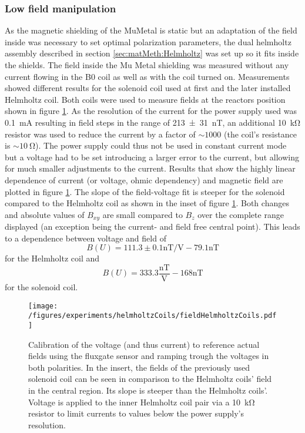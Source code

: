         \subsubsection{Low field manipulation}
        As the magnetic shielding of the MuMetal is static but an adaptation of the field inside was necessary to set optimal polarization parameters, the dual helmholtz assembly described in section \ref{sec:matMeth:Helmholtz} was set up so it fits inside the shields. The field inside the Mu Metal shielding was measured without any current flowing in the B0 coil as well as with the coil turned on. Measurements showed different results for the solenoid coil used at first and the later installed Helmholtz coil. Both coils were used to measure fields at the reactors position shown in figure \ref{figures:results:helmholtzCoilsCenterField}. As the resolution of the current for the power supply used was \SI{0.1}{\milli\ampere} resulting in field steps in the range of \SI{213\pm 31}{\nano\tesla}, an additional \SI{10}{\kilo\ohm} resistor was used to reduce the current by a factor of $\sim 1000$ (the coil's resistance is $\sim \SI{10}{\ohm}$). The power supply could thus not be used in constant current mode but a voltage had to be set introducing a larger error to the current, but allowing for much smaller adjustments to the current. Results that show the highly linear dependence of current (or voltage, ohmic dependency) and magnetic field are plotted in figure \ref{figures:results:helmholtzCoilsCenterField}. The slope of the field-voltage fit is steeper for the solenoid compared to the Helmholtz coil as shown in the inset of figure \ref{figures:results:helmholtzCoilsCenterField}. Both changes and absolute values of $B_{xy}$ are small compared to $B_z$ over the complete range displayed (an exception being the current- and field free central point). This leads to a dependence between voltage and field of
            \begin{equation}
                B(U) = 111.3\pm 0.1 \si{\nano\tesla\per\volt} - 79.1 \si{\nano\tesla}
            \end{equation}
            for the Helmholtz coil and
            \begin{equation}
                B(U) = 333.3 \frac{\si{\nano\tesla}}{\si{\volt}} - 168 \si{\nano\tesla}
            \end{equation}
            for the solenoid coil.
                \begin{figure}
                    \centering
                    \texttt{[image: /figures/experiments/helmholtzCoils/fieldHelmholtzCoils.pdf]}
                    \caption[Helmholtz fields]{Calibration of the voltage (and thus current) to reference actual fields using the fluxgate sensor and ramping trough the voltages in both polarities. In the insert, the fields of the previously used solenoid coil can be seen in comparison to the Helmholtz coils' field in the central region. Its slope is steeper than the Helmholtz coils'. Voltage is applied to the inner Helmholtz coil pair via a \SI{10}{\kilo\ohm} resistor to limit currents to values below the power supply's resolution.}
                    \label{figures:results:helmholtzCoilsCenterField}
                \end{figure}
